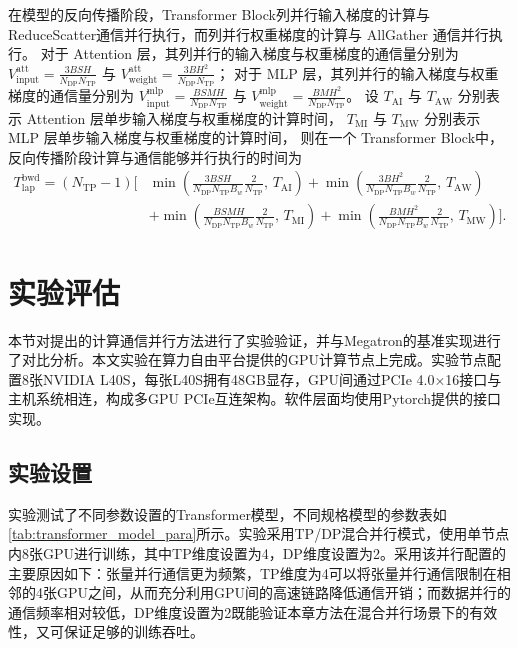在模型的反向传播阶段，Transformer Block列并行输入梯度的计算与ReduceScatter通信并行执行，而列并行权重梯度的计算与 AllGather 通信并行执行。
对于 Attention 层，其列并行的输入梯度与权重梯度的通信量分别为
$V_{\mathrm{input}}^{\mathrm{att}}
= \frac{3BSH}{N_{\mathrm{DP}}N_{\mathrm{TP}}}$ 与
$V_{\mathrm{weight}}^{\mathrm{att}}
= \frac{3BH^2}{N_{\mathrm{DP}}N_{\mathrm{TP}}}$；
对于 MLP 层，其列并行的输入梯度与权重梯度的通信量分别为
$V_{\mathrm{input}}^{\mathrm{mlp}}
= \frac{BSMH}{N_{\mathrm{DP}}N_{\mathrm{TP}}}$ 与
$V_{\mathrm{weight}}^{\mathrm{mlp}}
= \frac{BMH^2}{N_{\mathrm{DP}}N_{\mathrm{TP}}}$。
设 $T_{\mathrm{AI}}$ 与 $T_{\mathrm{AW}}$ 分别表示 Attention 层单步输入梯度与权重梯度的计算时间，
$T_{\mathrm{MI}}$ 与 $T_{\mathrm{MW}}$ 分别表示 MLP 层单步输入梯度与权重梯度的计算时间，
则在一个 Transformer Block中，反向传播阶段计算与通信能够并行执行的时间为
\begin{equation}
\begin{aligned}
T_{\mathrm{lap}}^{\mathrm{bwd}}
= (N_{\mathrm{TP}} - 1)\!\Big[
& \min\!\left(
\frac{3BSH}{N_{\mathrm{DP}} N_{\mathrm{TP}} B_w}\frac{2}{N_{\mathrm{TP}}},
\, T_{\mathrm{AI}}
\right)
+ \min\!\left(
\frac{3BH^2}{N_{\mathrm{DP}} N_{\mathrm{TP}} B_w}\frac{2}{N_{\mathrm{TP}}},
\, T_{\mathrm{AW}}
\right) \\
& + \min\!\left(
\frac{BSMH}{N_{\mathrm{DP}} N_{\mathrm{TP}} B_w}\frac{2}{N_{\mathrm{TP}}},
\, T_{\mathrm{MI}}
\right)
+ \min\!\left(
\frac{BMH^2}{N_{\mathrm{DP}} N_{\mathrm{TP}} B_w}\frac{2}{N_{\mathrm{TP}}},
\, T_{\mathrm{MW}}
\right)
\Big].
\end{aligned}
\end{equation}








\section{实验评估}
本节对提出的计算通信并行方法进行了实验验证，并与Megatron的基准实现进行了对比分析。本文实验在算力自由平台提供的GPU计算节点上完成。实验节点配置8张NVIDIA L40S，每张L40S拥有48GB显存，GPU间通过PCIe 4.0×16接口与主机系统相连，构成多GPU PCIe互连架构。软件层面均使用Pytorch提供的接口实现。

\subsection{实验设置}
实验测试了不同参数设置的Transformer模型，不同规格模型的参数表如\autoref{tab:transformer_model_para}所示。实验采用TP/DP混合并行模式，使用单节点内8张GPU进行训练，其中TP维度设置为4，DP维度设置为2。采用该并行配置的主要原因如下：张量并行通信更为频繁，TP维度为4可以将张量并行通信限制在相邻的4张GPU之间，从而充分利用GPU间的高速链路降低通信开销；而数据并行的通信频率相对较低，DP维度设置为2既能验证本章方法在混合并行场景下的有效性，又可保证足够的训练吞吐。

